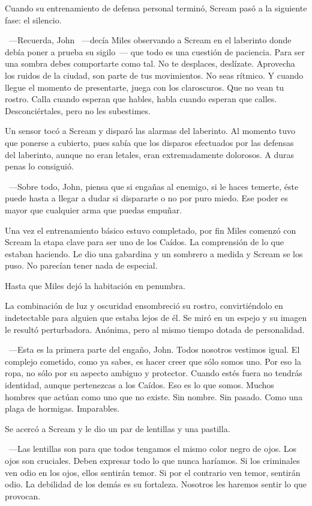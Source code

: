 Cuando su entrenamiento de defensa personal terminó, Scream pasó a la siguiente fase: el silencio.

~---Recuerda, John ~---decía Miles observando a Scream en el laberinto donde debía poner a prueba su sigilo~--- que todo es una cuestión de paciencia. Para ser una sombra debes comportarte como tal. No te desplaces, deslízate. Aprovecha los ruidos de la ciudad, son parte de tus movimientos. No seas rítmico. Y cuando llegue el momento de presentarte, juega con los claroscuros. Que no vean tu rostro. Calla cuando esperan que hables, habla cuando esperan que calles. Desconciértales, pero no les subestimes.

Un sensor tocó a Scream y disparó las alarmas del laberinto. Al momento tuvo que ponerse a cubierto, pues sabía que los disparos efectuados por las defensas del laberinto, aunque no eran letales, eran extremadamente dolorosos. A duras penas lo consiguió.

~---Sobre todo, John, piensa que si engañas al enemigo, si le haces temerte, éste puede hasta a llegar a dudar si dispararte o no por puro miedo. Ese poder es mayor que cualquier arma que puedas empuñar.

Una vez el entrenamiento básico estuvo completado, por fin Miles comenzó con Scream la etapa clave para ser uno de los Caídos. La comprensión de lo que estaban haciendo. Le dio una gabardina y un sombrero a medida y Scream se los puso. No parecían tener nada de especial.

Hasta que Miles dejó la habitación en penumbra.

La combinación de luz y oscuridad ensombreció su rostro, convirtiéndolo en indetectable para alguien que estaba lejos de él. Se miró en un espejo y su imagen le resultó perturbadora. Anónima, pero al mismo tiempo dotada de personalidad.

~---Esta es la primera parte del engaño, John. Todos nosotros vestimos igual. El complejo cometido, como ya sabes, es hacer creer que sólo somos uno. Por eso la ropa, no sólo por su aspecto ambiguo y protector. Cuando estés fuera no tendrás identidad, aunque pertenezcas a los Caídos. Eso es lo que somos. Muchos hombres que actúan como uno que no existe. Sin nombre. Sin pasado. Como una plaga de hormigas. Imparables.

Se acercó a Scream y le dio un par de lentillas y una pastilla.

~---Las lentillas son para que todos tengamos el mismo color negro de ojos. Los ojos son cruciales. Deben expresar todo lo que nunca haríamos. Si los criminales ven odio en los ojos, ellos sentirán temor. Si por el contrario ven temor, sentirán odio. La debilidad de los demás es su fortaleza. Nosotros les haremos sentir lo que provocan.

